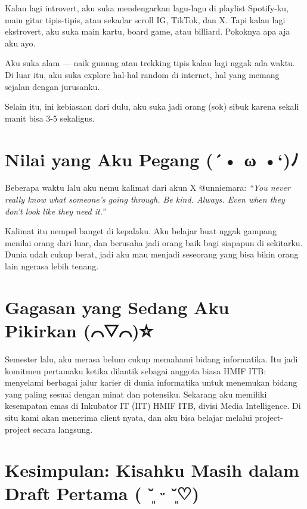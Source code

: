 \documentclass[
  letterpaper,
  DIV=11,
  numbers=noendperiod]{scrreprt}
\begin{document}
Kalau lagi introvert, aku suka mendengarkan lagu-lagu di playlist
Spotify-ku, main gitar tipis-tipis, atau sekadar scroll IG, TikTok, dan
X. Tapi kalau lagi ekstrovert, aku suka main kartu, board game, atau
billiard. Pokoknya apa aja aku ayo.

Aku suka alam --- naik gunung atau trekking tipis kalau lagi nggak ada
waktu. Di luar itu, aku suka explore hal-hal random di internet, hal
yang memang sejalan dengan jurusanku.

Selain itu, ini kebiasaan dari dulu, aku suka jadi orang (sok) sibuk
karena sekali manit bisa 3-5 sekaligus.

\section{\texorpdfstring{\textbf{Nilai yang Aku Pegang (´• ω
•`)ﾉ}}{Nilai yang Aku Pegang (´• ω •`)ﾉ}}\label{nilai-yang-aku-pegang-ux3c9-uxff89}

Beberapa waktu lalu aku nemu kalimat dari akun X @unniemara: \emph{``You
never really know what someone's going through. Be kind. Always. Even
when they don't look like they need it.''}

Kalimat itu nempel banget di kepalaku. Aku belajar buat nggak gampang
menilai orang dari luar, dan berusaha jadi orang baik bagi siapapun di
sekitarku. Dunia udah cukup berat, jadi aku mau menjadi seseorang yang
bisa bikin orang lain ngerasa lebih tenang.

\section{\texorpdfstring{\textbf{Gagasan yang Sedang Aku Pikirkan
(⌒▽⌒)☆}}{Gagasan yang Sedang Aku Pikirkan (⌒▽⌒)☆}}\label{gagasan-yang-sedang-aku-pikirkan}

Semester lalu, aku merasa belum cukup memahami bidang informatika. Itu
jadi komitmen pertamaku ketika dilantik sebagai anggota biasa HMIF ITB:
menyelami berbagai jalur karier di dunia informatika untuk menemukan
bidang yang paling sesuai dengan minat dan potensiku. Sekarang aku
memiliki kesempatan emas di Inkubator IT (IIT) HMIF ITB, divisi Media
Intelligence. Di situ kami akan menerima client nyata, dan aku bisa
belajar melalui project-project secara langsung.

\section{\texorpdfstring{\textbf{Kesimpulan: Kisahku Masih dalam Draft
Pertama ( ˘͈ ᵕ
˘͈♡)}}{Kesimpulan: Kisahku Masih dalam Draft Pertama ( ˘͈ ᵕ ˘͈♡)}}\label{kesimpulan-kisahku-masih-dalam-draft-pertama-ux1d55}
\end{document}
